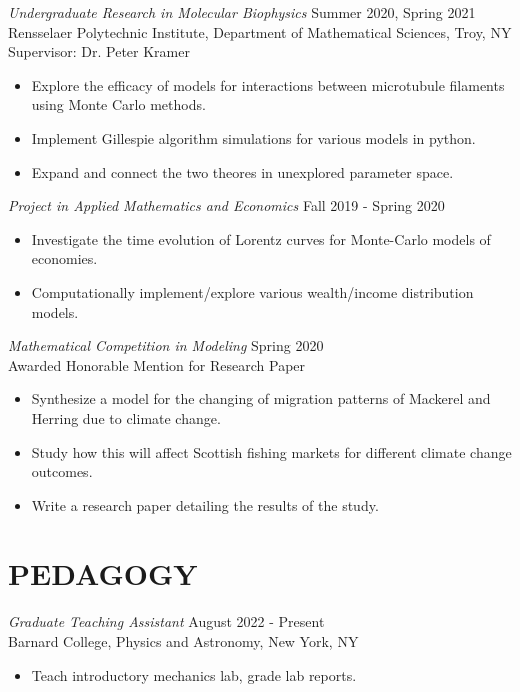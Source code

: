\documentclass[margin]{rpires}
\begin{document}
\begin{resume}
    {\sl Undergraduate Research in Molecular Biophysics} \hfill Summer 2020, Spring 2021 \\
    Rensselaer Polytechnic Institute, 
    Department of Mathematical Sciences, Troy, NY\\
    Supervisor: Dr. Peter Kramer
    \begin{itemize}  \itemsep -2pt %
    \item Explore the efficacy of models for interactions between microtubule filaments using Monte Carlo methods.
    \item Implement Gillespie algorithm simulations for various models in python. 
    \item Expand and connect the two theores in unexplored parameter space.
    \end{itemize}

    {\sl Project in Applied Mathematics and Economics} \hfill Fall 2019 - Spring 2020
    \begin{itemize}  \itemsep -2pt %
        \item Investigate the time evolution of Lorentz curves for Monte-Carlo models of economies.
        \item Computationally implement/explore various wealth/income distribution models.
    \end{itemize}

    {\sl Mathematical Competition in Modeling} \hfill Spring 2020 \\
    Awarded Honorable Mention for Research Paper
    \begin{itemize}  \itemsep -2pt %
        \item Synthesize a model for the changing of migration patterns of Mackerel and Herring due to climate change.
        \item Study how this will affect Scottish fishing markets for different climate change outcomes.
        \item Write a research paper detailing the results of the study.
    \end{itemize}

\section{PEDAGOGY}
    
    {\sl Graduate Teaching Assistant} \hfill August 2022 - Present \\
    Barnard College, Physics and Astronomy, New York, NY
    \begin{itemize}  \itemsep -2pt %
        \item Teach introductory mechanics lab, grade lab reports.
    \end{itemize}


\end{resume}
\end{document}
